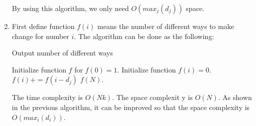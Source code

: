 \documentclass{article}
\begin{document}
\begin{enumerate}
			By using this algorithm, we only need $O(max_j(d_j))$ space.
			\item First define function $f(i)$ means the number of different ways to make change for number $i$. The algorithm can be done as the following:
			\begin{algorithm}[H]
				\caption{Output number of different ways}
				\begin{algorithmic}[1]
				\State Initialize function $f$ for $f(0) = 1$.
				\State {}
					\State Initialize function $f(i) = 0$.
							\State $f(i) += f(i - d_j)$
						\EndIf
					\EndFor
				\EndFor
				\State \Return $f(N)$.
				\end{algorithmic}
			\end{algorithm}
			The time complexity is $O(Nk)$. The space complexit y is $O(N)$. As shown in the previous algorithm, it can be improved so that the space complexity is $O(max_i(d_i))$.
		\end{enumerate}
\end{document}
